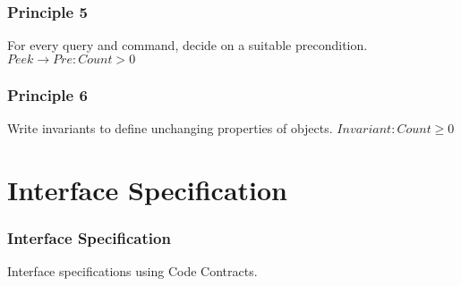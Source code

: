 \begin{frame}
    \frametitle{Principle 5}
    \begin{block}{For every query and command, decide on a suitable
        precondition.}
        $Peek \to Pre: Count > 0$
    \end{block}
\end{frame}

\begin{frame}
    \frametitle{Principle 6}
    \begin{block}{Write invariants to define unchanging properties of objects.}
        $Invariant: Count \geq 0$
    \end{block}
\end{frame}

\section{Interface Specification}

\begin{frame}
    \frametitle{Interface Specification}
    Interface specifications using Code Contracts.
\end{frame}




